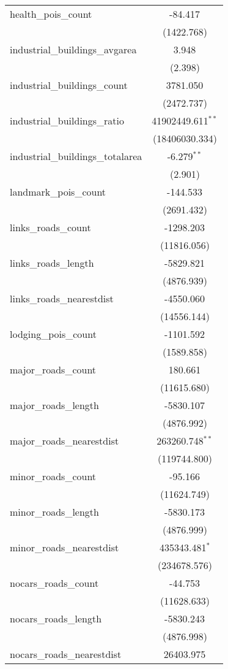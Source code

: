 \begin{table}[!htbp]
\begin{tabular}{@{\extracolsep{5pt}}lc}
 health_pois_count & -84.417$^{}$ \\
  & (1422.768) \\
 industrial_buildings_avgarea & 3.948$^{}$ \\
  & (2.398) \\
 industrial_buildings_count & 3781.050$^{}$ \\
  & (2472.737) \\
 industrial_buildings_ratio & 41902449.611$^{**}$ \\
  & (18406030.334) \\
 industrial_buildings_totalarea & -6.279$^{**}$ \\
  & (2.901) \\
 landmark_pois_count & -144.533$^{}$ \\
  & (2691.432) \\
 links_roads_count & -1298.203$^{}$ \\
  & (11816.056) \\
 links_roads_length & -5829.821$^{}$ \\
  & (4876.939) \\
 links_roads_nearestdist & -4550.060$^{}$ \\
  & (14556.144) \\
 lodging_pois_count & -1101.592$^{}$ \\
  & (1589.858) \\
 major_roads_count & 180.661$^{}$ \\
  & (11615.680) \\
 major_roads_length & -5830.107$^{}$ \\
  & (4876.992) \\
 major_roads_nearestdist & 263260.748$^{**}$ \\
  & (119744.800) \\
 minor_roads_count & -95.166$^{}$ \\
  & (11624.749) \\
 minor_roads_length & -5830.173$^{}$ \\
  & (4876.999) \\
 minor_roads_nearestdist & 435343.481$^{*}$ \\
  & (234678.576) \\
 nocars_roads_count & -44.753$^{}$ \\
  & (11628.633) \\
 nocars_roads_length & -5830.243$^{}$ \\
  & (4876.998) \\
 nocars_roads_nearestdist & 26403.975$^{}$ \\

\end{tabular}
\end{table}

